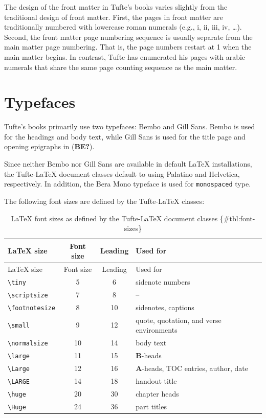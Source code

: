 \documentclass[
  twoside,
  symmetric]{tufte-book}
\begin{document}
The design of the front matter in Tufte's books varies slightly from the
traditional design of front matter. First, the pages in front matter are
traditionally numbered with lowercase roman numerals (e.g., i, ii, iii,
iv, \ldots). Second, the front matter page numbering sequence is usually
separate from the main matter page numbering. That is, the page numbers
restart at 1 when the main matter begins. In contrast, Tufte has
enumerated his pages with arabic numerals that share the same page
counting sequence as the main matter.

\section{Typefaces}\label{sec:typefaces1}

Tufte's books primarily use two typefaces: Bembo and Gill Sans. Bembo is
used for the headings and body text, while Gill Sans is used for the
title page and opening epigraphs in (\textbf{BE?}).

Since neither Bembo nor Gill Sans are available in default LaTeX
installations, the Tufte-LaTeX document classes default to using
Palatino and Helvetica, respectively. In addition, the Bera Mono
typeface is used for \texttt{monospaced} type.

The following font sizes are defined by the Tufte-LaTeX classes:

\begin{longtable}[]{@{}lccl@{}}
\caption{LaTeX font sizes as defined by the Tufte-LaTeX document classes
\{\#tbl:font-sizes\}}\tabularnewline
\toprule\noalign{}
LaTeX size & Font size & Leading & Used for \\
\midrule\noalign{}
\endfirsthead
\toprule\noalign{}
LaTeX size & Font size & Leading & Used for \\
\midrule\noalign{}
\endhead
\bottomrule\noalign{}
\endlastfoot
\texttt{\textbackslash{}tiny} & 5 & 6 & sidenote numbers \\
\texttt{\textbackslash{}scriptsize} & 7 & 8 & -- \\
\texttt{\textbackslash{}footnotesize} & 8 & 10 & sidenotes, captions \\
\texttt{\textbackslash{}small} & 9 & 12 & quote, quotation, and verse
environments \\
\texttt{\textbackslash{}normalsize} & 10 & 14 & body text \\
\texttt{\textbackslash{}large} & 11 & 15 & \textbf{B}-heads \\
\texttt{\textbackslash{}Large} & 12 & 16 & \textbf{A}-heads, TOC
entries, author, date \\
\texttt{\textbackslash{}LARGE} & 14 & 18 & handout title \\
\texttt{\textbackslash{}huge} & 20 & 30 & chapter heads \\
\texttt{\textbackslash{}Huge} & 24 & 36 & part titles \\
\end{longtable}
\end{document}
